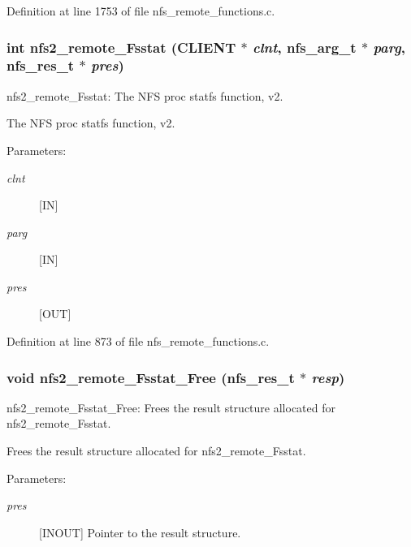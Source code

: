 Definition at line 1753 of file nfs\_\-remote\_\-functions.c.
\subsubsection[{nfs2\_\-remote\_\-Fsstat}]{\setlength{\rightskip}{0pt plus 5cm}int nfs2\_\-remote\_\-Fsstat (CLIENT $\ast$ {\em clnt}, \/  nfs\_\-arg\_\-t $\ast$ {\em parg}, \/  nfs\_\-res\_\-t $\ast$ {\em pres})}\label{group__NFSprocs_ga34326e310c259cdff88acf9d4803b23}


nfs2\_\-remote\_\-Fsstat: The NFS proc statfs function, v2.

The NFS proc statfs function, v2.

\begin{Desc}
\item[Parameters:]
\begin{description}
\item[{\em clnt}][IN] \item[{\em parg}][IN] \item[{\em pres}][OUT] \end{description}
\end{Desc}


Definition at line 873 of file nfs\_\-remote\_\-functions.c.
\subsubsection[{nfs2\_\-remote\_\-Fsstat\_\-Free}]{\setlength{\rightskip}{0pt plus 5cm}void nfs2\_\-remote\_\-Fsstat\_\-Free (nfs\_\-res\_\-t $\ast$ {\em resp})}\label{group__NFSprocs_g22a37656c62766455150ae86f45de6e7}


nfs2\_\-remote\_\-Fsstat\_\-Free: Frees the result structure allocated for nfs2\_\-remote\_\-Fsstat.

Frees the result structure allocated for nfs2\_\-remote\_\-Fsstat.

\begin{Desc}
\item[Parameters:]
\begin{description}
\item[{\em pres}][INOUT] Pointer to the result structure. \end{description}
\end{Desc}


